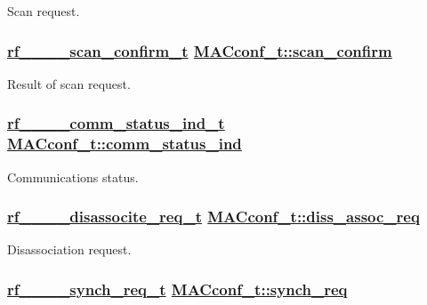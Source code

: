 Scan request. \hypertarget{structMACconf__t_e9b07a3ac6318d15eed2e166c751a712}{
\subsubsection[scan\_\-confirm]{\setlength{\rightskip}{0pt plus 5cm}\hyperlink{structrf__802__15__4__scan__confirm__t}{rf\_\_\_\_\-scan\_\-confirm\_\-t} \hyperlink{structMACconf__t_e9b07a3ac6318d15eed2e166c751a712}{MACconf\_\-t::scan\_\-confirm}}}
\label{structMACconf__t_e9b07a3ac6318d15eed2e166c751a712}


Result of scan request. \hypertarget{structMACconf__t_d549d77083fd4e3268eb07f5253d486d}{
\subsubsection[comm\_\-status\_\-ind]{\setlength{\rightskip}{0pt plus 5cm}\hyperlink{structrf__802__15__4__comm__status__ind__t}{rf\_\_\_\_\-comm\_\-status\_\-ind\_\-t} \hyperlink{structMACconf__t_d549d77083fd4e3268eb07f5253d486d}{MACconf\_\-t::comm\_\-status\_\-ind}}}
\label{structMACconf__t_d549d77083fd4e3268eb07f5253d486d}


Communications status. \hypertarget{structMACconf__t_78aa8f60a5acacc24e18bb33458945e1}{
\subsubsection[diss\_\-assoc\_\-req]{\setlength{\rightskip}{0pt plus 5cm}\hyperlink{structrf__802__15__4__disassocite__req__t}{rf\_\_\_\_\-disassocite\_\-req\_\-t} \hyperlink{structMACconf__t_78aa8f60a5acacc24e18bb33458945e1}{MACconf\_\-t::diss\_\-assoc\_\-req}}}
\label{structMACconf__t_78aa8f60a5acacc24e18bb33458945e1}


Disassociation request. \hypertarget{structMACconf__t_52c0778c38fbd508c85c73b6843c34df}{
\subsubsection[synch\_\-req]{\setlength{\rightskip}{0pt plus 5cm}\hyperlink{structrf__802__15__4__synch__req__t}{rf\_\_\_\_\-synch\_\-req\_\-t} \hyperlink{structMACconf__t_52c0778c38fbd508c85c73b6843c34df}{MACconf\_\-t::synch\_\-req}}}
\label{structMACconf__t_52c0778c38fbd508c85c73b6843c34df}


